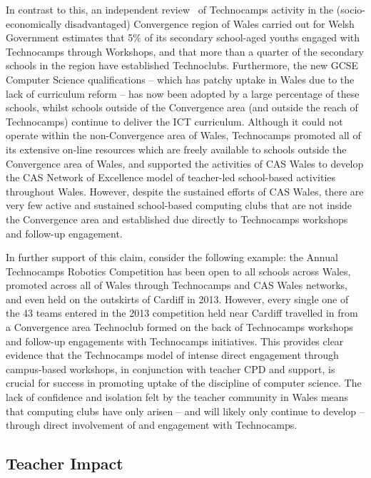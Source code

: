 \documentclass{llncs}
\begin{document}
In contrast to this, an independent review~\cite{Wavehill:2015} of
Technocamps activity in the (socio-economically disadvantaged)
Convergence region of Wales carried out for Welsh Government estimates
that 5\% of its secondary school-aged youths
engaged with Technocamps through Workshops, and that more than a
quarter of the secondary schools in the region have established
Technoclubs.  Furthermore, the new GCSE Computer Science
qualifications -- which has patchy uptake in Wales due to the lack of
curriculum reform -- has now been adopted by a large percentage of
these schools, whilst schools outside of the Convergence area (and
outside the reach of Technocamps) continue to deliver the ICT
curriculum. Although it could not operate within the non-Convergence area of
Wales, Technocamps promoted all of its extensive on-line resources
which are freely available to schools outside the Convergence area of
Wales, and supported the activities of CAS Wales to develop the CAS
Network of Excellence model of teacher-led school-based activities
throughout Wales. However, despite the sustained efforts of CAS
Wales, there are very few active and sustained school-based computing
clubs that are not inside the Convergence area and established due
directly to Technocamps workshops and follow-up engagement.

In further support of this claim, consider the following example: the Annual
Technocamps Robotics Competition has been open to all schools across
Wales, promoted across all of Wales through Technocamps and CAS Wales
networks, and even held on the outskirts of Cardiff in 2013.  However,
every single one of the 43 teams entered in the 2013 competition held
near Cardiff travelled in from a Convergence area Technoclub formed on
the back of Technocamps workshops and follow-up engagements with
Technocamps initiatives. This provides clear evidence that the
Technocamps model of intense direct engagement through campus-based
workshops, in conjunction with teacher CPD and support, is crucial for
success in promoting uptake of the discipline of computer science. The
lack of confidence and isolation felt by the teacher community in
Wales means that computing clubs have only arisen -- and will likely
only continue to develop -- through direct involvement of and
engagement with Technocamps.

\subsection{Teacher Impact}\label{teacherrecog}
\end{document}
